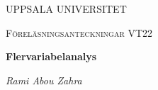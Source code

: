 \begin{titlepage}

  \centering
	{\scshape\LARGE UPPSALA UNIVERSITET\par}
	\vspace{1cm}
  {\scshape\Large {Föreläsningsanteckningar VT22} \par}
	\vspace{1.5cm}
  {\huge\bfseries {Flervariabelanalys} \par}
	\vspace{2cm}
	{\Large\itshape Rami Abou Zahra \par}
	\vfill
  \vfill


\end{titlepage}
